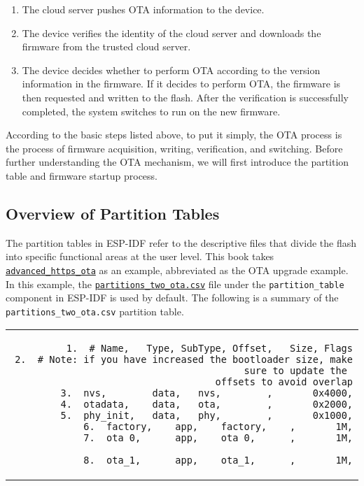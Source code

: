 \documentclass[a4paper,12pt]{book}
\begin{document}
\begin{enumerate}[label=(\arabic*)]
    \item The cloud server pushes OTA information to the device.
    \item The device verifies the identity of the cloud server and downloads the firmware from the trusted cloud server.
    \item The device decides whether to perform OTA according to the version information in the firmware. If it decides to perform OTA, the firmware is then requested and written to the flash. After the verification is successfully completed, the system switches to run on the new firmware.
\end{enumerate}

According to the basic steps listed above, to put it simply, the OTA process is the process of firmware acquisition, writing, verification, and switching. Before further understanding the OTA mechanism, we will first introduce the partition table and firmware startup process.

\subsection{Overview of Partition Tables}
The partition tables in ESP-IDF refer to the descriptive files that divide the flash into specific functional areas at the user level. This book takes \href{https://github.com/espressif/esp-idf/tree/master/examples/system/ota/advanced_https_ota}{\texttt{advanced\_https\_ota}} as an example, abbreviated as the OTA upgrade example. In this example, the \href{https://github.com/espressif/esp-idf/blob/master/components/partition_table/partitions_two_ota.csv}{\texttt{partitions\_two\_ota.csv}} file under the \verb|partition_table| component in ESP-IDF is used by default. The following is a summary of the \verb|partitions_two_ota.csv| partition table.

\begin{codebloc}
\begin{tabular}{d}
\vspace{2pt}
\begin{verbatim}
1.  # Name,   Type, SubType, Offset,   Size, Flags
2.  # Note: if you have increased the bootloader size, make sure to update the 
offsets to avoid overlap
3.  nvs,        data,   nvs,        ,       0x4000,
4.  otadata,    data,   ota,        ,       0x2000,
5.  phy_init,   data,   phy,        ,       0x1000,
6.  factory,    app,    factory,    ,       1M,
7.  ota_0,      app,    ota_0,      ,       1M,
\end{verbatim}
\verb|8.  ota_1,      app,    ota_1,      ,       1M,|
\end{tabular}
\end{codebloc}
\end{document}
